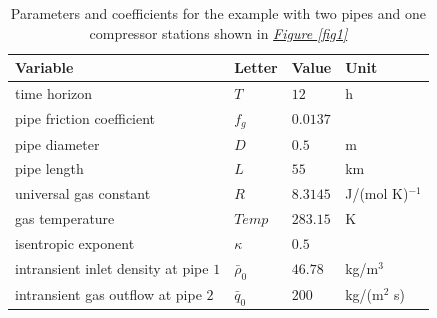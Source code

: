 \documentclass[12pt]{article}
\numberwithin{equation}{section}
\begin{document}
\begin{table}[htbp]
	\centering
	\begin{tabular}{l l l l}
		\toprule
		Variable & Letter & Value & Unit \\
		\midrule 
		time horizon & $T$ & $12$ & h \\
		pipe friction coefficient & $f_g$ & $0.0137$ &  \\
		pipe diameter & $D$ & $0.5$ & m \\
		pipe length & $L$ & $55$ & km \\
		universal gas constant & $R$ & $8.3145$ & J/(mol K)$^{-1}$ \\
		gas temperature & $Temp$ & $283.15$ & K \\
		isentropic exponent & $\kappa$ & $0.5$ & \\
		intransient inlet density at pipe $1$ & $\bar{\rho}_0$ & $46.78$ & kg/m$^{3}$ \\
		intransient gas outflow at pipe $2$ & $\bar{q}_0$ & $200$ & kg/(m$^2$ s) \\
		\bottomrule
	\end{tabular}
	\caption{Parameters and coefficients for the example with two pipes and one compressor stations shown in \hyperref[fig1]{\textit{Figure \ref*{fig1}}}}
	\label{tab:networkParameters}
\end{table}
\end{document}
